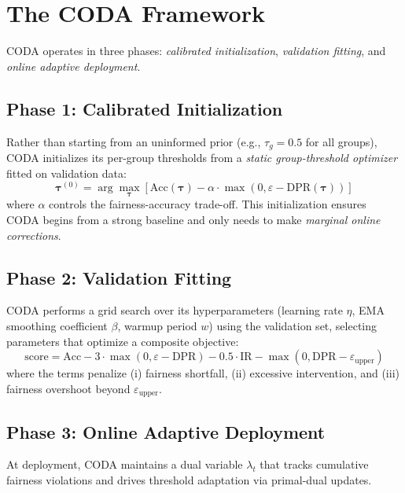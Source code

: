 \documentclass[letterpaper]{article} %
\theoremstyle{definition}
\begin{document}
\section{The CODA Framework}
\label{sec:method}

CODA operates in three phases: \emph{calibrated initialization}, \emph{validation fitting}, and \emph{online adaptive deployment}.

\subsection{Phase 1: Calibrated Initialization}
\label{sec:calibrated_init}

Rather than starting from an uninformed prior (e.g., $\tau_g = 0.5$ for all groups), CODA initializes its per-group thresholds from a \emph{static group-threshold optimizer} fitted on validation data:
\begin{equation}
\boldsymbol{\tau}^{(0)} = \arg\max_{\boldsymbol{\tau}} \left[ \text{Acc}(\boldsymbol{\tau}) - \alpha \cdot \max(0, \varepsilon - \text{DPR}(\boldsymbol{\tau})) \right]
\label{eq:init}
\end{equation}
where $\alpha$ controls the fairness-accuracy trade-off. This initialization ensures CODA begins from a strong baseline and only needs to make \emph{marginal online corrections}.

\subsection{Phase 2: Validation Fitting}
CODA performs a grid search over its hyperparameters (learning rate $\eta$, EMA smoothing coefficient $\beta$, warmup period $w$) using the validation set, selecting parameters that optimize a composite objective:
\begin{equation}
\text{score} = \text{Acc} - 3 \cdot \max(0, \varepsilon{-}\text{DPR}) - 0.5 \cdot \text{IR} - \max(0, \text{DPR}{-}\varepsilon_{\text{upper}})
\label{eq:gridsearch}
\end{equation}
where the terms penalize (i) fairness shortfall, (ii) excessive intervention, and (iii) fairness overshoot beyond $\varepsilon_{\text{upper}}$.

\subsection{Phase 3: Online Adaptive Deployment}

At deployment, CODA maintains a dual variable $\lambda_t$ that tracks cumulative fairness violations and drives threshold adaptation via primal-dual updates.
\end{document}

